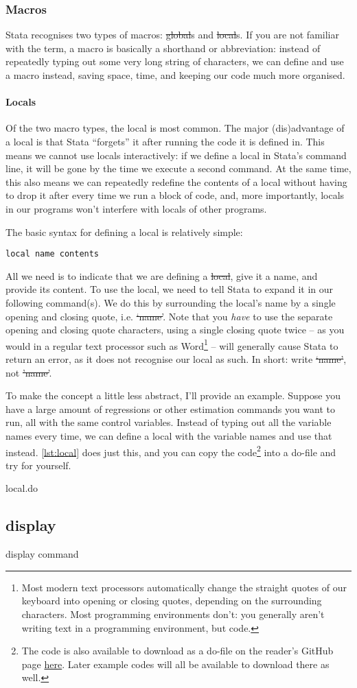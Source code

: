 \subsubsection{Macros}

Stata recognises two types of macros: \st{global}s and \st{local}s.
If you are not familiar with the term,
a macro is basically a shorthand or abbreviation:
instead of repeatedly typing out some very long string of characters,
we can define and use a macro instead, saving space, time,
and keeping our code much more organised.

\paragraph{Locals}
Of the two macro types, the local is most common.
The major (dis)advantage of a local is that Stata ``forgets'' it after running the code it is defined in.
This means we cannot use locals interactively:
if we define a local in Stata's command line,
it will be gone by the time we execute a second command.
At the same time,
this also means we can repeatedly redefine the contents of a local without having to drop it after every time we run a block of code,
and, more importantly, locals in our programs won't interfere with locals of other programs.

The basic syntax for defining a local is relatively simple:
\begin{verbatim}
local name contents
\end{verbatim}
All we need is to indicate that we are defining a \st{local}, give it a name,
and provide its content.
To use the local, we need to tell Stata to expand it in our following command(s).
We do this by surrounding the local's name by a single opening and closing quote, i.e. \st{`name'}.
Note that you \emph{have} to use the separate opening and closing quote characters,
using a single closing quote twice --
as you would in a regular text processor such as Word\footnote{%
Most modern text processors automatically change the straight quotes of our keyboard into opening or closing quotes,
depending on the surrounding characters.
Most programming environments don't:
you generally aren't writing text in a programming environment, but code.} --
will generally cause Stata to return an error,
as it does not recognise our local as such.
In short: write \st{`name'}, not \st{'name'}.

To make the concept a little less abstract, I'll provide an example.
Suppose you have a large amount of regressions or other estimation commands you want to run,
all with the same control variables.
Instead of typing out all the variable names every time,
we can define a local with the variable names and use that instead.
\cref{lst:local} does just this, and you can copy the code\footnote{The code is also available to download as a do-file on the reader's GitHub page \href{https://github.com/Ahvns/ETPreader/tree/main/Example\%20do-files}{here}. Later example codes will all be available to download there as well.} into a do-file and try for yourself.

\begin{listing}[htp]
\caption{local.do}\label{lst:local}
\end{listing}
\subsection{display}

display command
